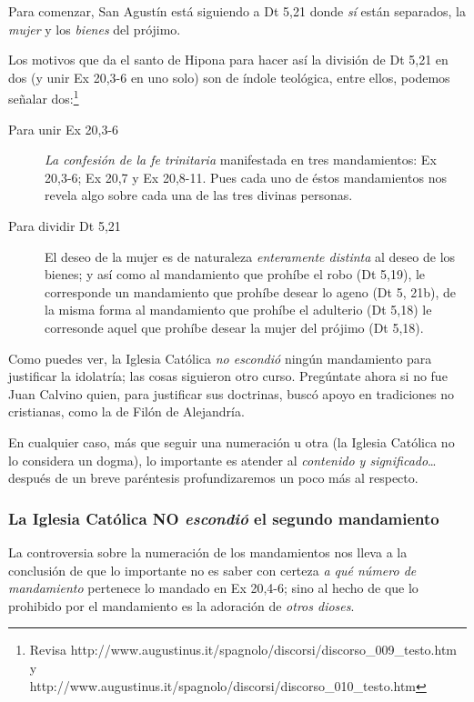 \documentclass{article}
\begin{document}
Para comenzar, San Agust\'{i}n est\'a siguiendo a Dt 5,21 donde \emph{s\'{i}} est\'an separados, la \emph{mujer} y los \emph{bienes} del pr\'ojimo.

Los motivos que da el santo de Hipona para hacer as\'{i} la divisi\'on de Dt 5,21 en dos (y unir Ex 20,3-6 en uno solo) son de \'{i}ndole teol\'ogica, entre ellos, podemos se\~nalar dos:\footnote{Revisa http://www.augustinus.it/spagnolo/discorsi/discorso\_009\_testo.htm y \\ http://www.augustinus.it/spagnolo/discorsi/discorso\_010\_testo.htm}

\begin{description}
\item[Para unir Ex 20,3-6] \emph{La confesi\'on de la fe trinitaria} manifestada en tres mandamientos: Ex 20,3-6; Ex 20,7 y Ex 20,8-11. Pues cada uno de \'estos mandamientos nos revela algo sobre cada una de las tres divinas personas.
\item[Para dividir Dt 5,21] El deseo de la mujer es de naturaleza \emph{enteramente distinta} al deseo de los bienes; y as\'i como al mandamiento que proh\'{i}be el robo (Dt 5,19), le corresponde un mandamiento que proh\'{i}be desear lo ageno (Dt 5, 21b), de la misma forma al mandamiento que proh\'{i}be el adulterio (Dt 5,18) le corresonde aquel que proh\'{i}be desear la mujer del pr\'ojimo (Dt 5,18).
\end{description}

\noindent
Como puedes ver, la Iglesia Cat\'olica \emph{no escondi\'o} ning\'un mandamiento para justificar la idolatr\'{i}a; las cosas siguieron otro curso. Preg\'untate ahora si no fue Juan Calvino quien, para justificar sus doctrinas, busc\'o apoyo en tradiciones no cristianas, como la de Fil\'on de Alejandr\'{i}a.

En cualquier caso, m\'as que seguir una numeraci\'on u otra (la Iglesia Cat\'olica no lo considera un dogma), lo importante es atender al \emph{contenido y significado}\ldots despu\'es de un breve par\'entesis profundizaremos un poco m\'as al respecto.

\subsubsection{La Iglesia Cat\'olica NO \emph{escondi\'o} el segundo mandamiento}
La controversia sobre la numeraci\'on de los mandamientos nos lleva a la conclusi\'on de que lo importante no es saber con certeza \emph{a qu\'e n\'umero de mandamiento} pertenece lo mandado en Ex 20,4-6; sino al hecho de que lo prohibido por el mandamiento es la adoraci\'on de \emph{otros dioses}.
\end{document}

